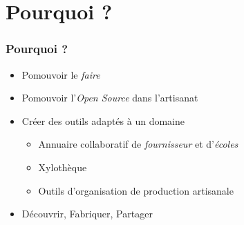 \section{Pourquoi ?}

\begin{frame}
  \frametitle{Pourquoi ?}

  \begin{itemize}
    \item Pomouvoir le \emph{faire}
    \item Pomouvoir l'\emph{Open Source} dans l'artisanat
    \item Créer des outils adaptés à un domaine
    \smallskip
    {\small\begin{itemize}
      \item Annuaire collaboratif de \emph{fournisseur} et d'\emph{écoles}
      \item Xylothèque
      \item Outils d'organisation de production artisanale
    \end{itemize}}
    \smallskip
    \item Découvrir, Fabriquer, Partager
  \end{itemize}
\end{frame}

\begin{frame}
    \begin{center}
    \end{center}
\end{frame}

